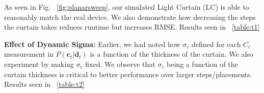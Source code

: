 As seen in Fig. ~\ref{fig:planarsweep}, our simulated Light Curtain (LC) is able to reasonably match the real device. We also demonstrate how decreasing the steps the curtain takes reduces runtime but increases RMSE. Results seen in ~\ref{table:t1}

\noindent
\begin{table}[h]
   \centering
   \caption{Error wrt to time and number of Sweep steps}
   \label{table:t1}
\end{table}

\textbf{Effect of Dynamic Sigma:} Earlier, we had noted how $\sigma_{c}$ defined for each $C_{i}$ measurement in $P\left(\mathbf{c}_{t}|\mathbf{d}_{t}\right)$ is a function of the thickness of the curtain. We also experiment by making $\sigma_{c}$ fixed. We observe that $\sigma_{c}$ being a function of the curtain thickness is critical to better performance over larger steps/placements. Results seen in ~\ref{table:t2}

\noindent
\begin{table}[h]
   \centering
   \caption{$\sigma_{c}$ in generated $P\left(\mathbf{c}_{t}|\mathbf{d}_{t}\right)$ being fixed vs being dynamic as a function of curtain thickness with real LC}
   \label{table:t2}
\end{table}


